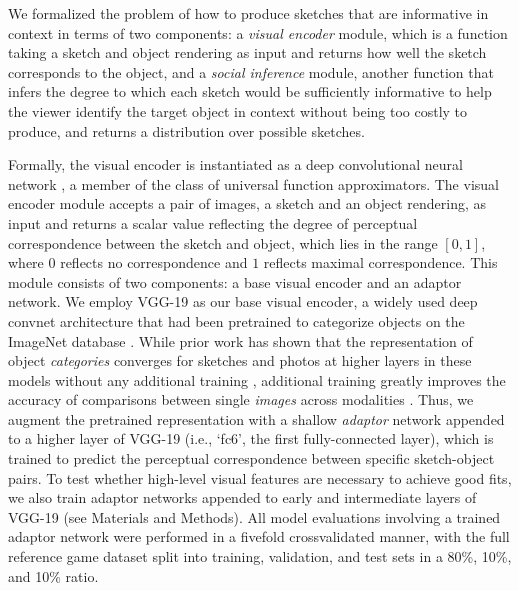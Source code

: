 \documentclass[9pt,twocolumn,twoside]{pnas-new}
\begin{document}
We formalized the problem of how to produce sketches that are informative in context in terms of two components: a \textit{visual encoder} module, which is a function taking a sketch and object rendering as input and returns how well the sketch corresponds to the object, and a \textit{social inference} module, another function that infers the degree to which each sketch would be sufficiently informative to help the viewer identify the target object in context without being too costly to produce, and returns a distribution over possible sketches. 


Formally, the visual encoder is instantiated as a deep convolutional neural network \cite{hornik1991approximation}, a member of the class of universal function approximators. 
The visual encoder module accepts a pair of images, a sketch and an object rendering, as input and returns a scalar value reflecting the degree of perceptual correspondence between the sketch and object, which lies in the range $[0,1]$, where $0$ reflects no correspondence and $1$ reflects maximal correspondence. 
This module consists of two components: a base visual encoder and an adaptor network. We employ VGG-19 \cite{simonyan2014very} as our base visual encoder, a widely used deep convnet architecture that had been pretrained to categorize objects on the ImageNet database \cite{deng2009imagenet}. 
While prior work has shown that the representation of object \textit{categories} converges for sketches and photos at higher layers in these models without any additional training \cite{FanCommon2018}, additional training greatly improves the accuracy of comparisons between single \textit{images} across modalities \cite{sangkloy2016sketchy}. 
Thus, we augment the pretrained representation with a shallow \textit{adaptor} network appended to a higher layer of VGG-19 (i.e., `fc6', the first fully-connected layer), which is trained to predict the perceptual correspondence between specific sketch-object pairs. 
To test whether high-level visual features are necessary to achieve good fits, we also train adaptor networks appended to early and intermediate layers of VGG-19 (see Materials and Methods). 
All model evaluations involving a trained adaptor network were performed in a fivefold crossvalidated manner, with the full reference game dataset split into training, validation, and test sets in a 80\%, 10\%, and 10\% ratio. 
\end{document}
